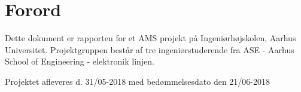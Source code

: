 \section*{Forord}
Dette dokument er rapporten for et AMS projekt på Ingeniørhøjskolen, Aarhus Universitet. 
Projektgruppen består af tre ingeniørstuderende fra ASE - Aarhus School of Engineering - elektronik linjen.

Projektet afleveres d. 31/05-2018 med bedømmelsesdato den 21/06-2018